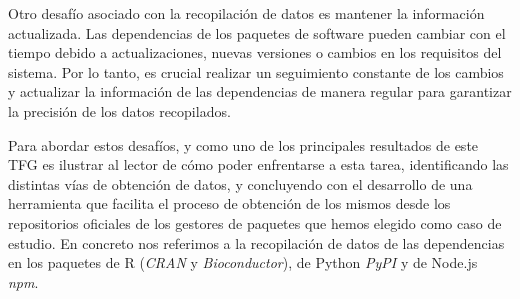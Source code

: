Otro desafío asociado con la recopilación de datos es mantener la información actualizada. Las dependencias de los 
paquetes de software pueden cambiar con el tiempo debido a actualizaciones, nuevas versiones o cambios en los requisitos 
del sistema. Por lo tanto, es crucial realizar un seguimiento constante de los cambios y actualizar la información 
de las dependencias de manera regular para garantizar la precisión de los datos recopilados.


Para abordar estos desafíos, y como uno de los principales resultados de este TFG es ilustrar al 
lector de cómo poder enfrentarse a esta tarea, identificando las distintas vías de obtención de datos, y concluyendo 
con el desarrollo de una herramienta que facilita el proceso de obtención de los mismos desde los repositorios
oficiales de los gestores de paquetes que hemos elegido como caso de estudio.  En concreto nos referimos a la 
recopilación de datos de las dependencias en los paquetes de R (\textit{CRAN} y \textit{Bioconductor}), de Python \textit{PyPI} y de Node.js \textit{npm}.

